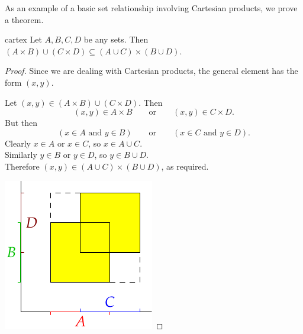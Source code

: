 As an example of a basic set relationship involving Cartesian products, we prove a theorem.

\begin{thm}{}{cartex}
	Let $A,B,C,D$ be any sets. Then $(A\times B)\cup(C\times D)\subseteq(A\cup C)\times(B\cup D)$.
\end{thm}

\begin{proof}
	Since we are dealing with Cartesian products, the general element has the form $(x,y)$.\par
	\begin{minipage}[t]{0.65\linewidth}\vspace{0pt}
		Let $(x,y)\in(A\times B)\cup(C\times D)$. Then 
		\[(x,y)\in A\times B\qquad \text{or}\qquad (x,y)\in C\times D.\]
		But then
		\[(x\in A\text{ and }y\in B)\qquad\text{or}\qquad(x\in C\text{ and }y\in D).\]
		Clearly $x\in A$ or $x\in C$, so $x\in A\cup C$.\\
		Similarly $y\in B$ or $y\in D$, so $y\in B\cup D$.\\
		Therefore $(x,y)\in (A\cup C)\times(B\cup D)$, as required.
	\end{minipage}
	\qquad
	\begin{minipage}[t]{0.3\linewidth}\vspace{0pt}
		\centering
		\includegraphics[width=\textwidth]{setsii-04-cartesian}
	\end{minipage}
\end{proof}

